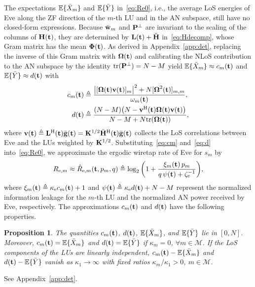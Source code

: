 \documentclass[journal]{IEEEtran}
\newtheorem{proposition}{Proposition}
\begin{document}
The expectations $\mathbb{E}\{\bar X_m\}$ and $\mathbb{E}\{\bar Y\}$ in~\eqref{eq:Re0}, i.e., the average LoS energies of Eve along the ZF direction of the $m$-th LU and in the AN subspace, still have no closed-form expressions. Because $\bar{\mathbf{w}}_m$ and $\mathbf{P}^{\perp}$ are invariant to the scaling of the columns of $\mathbf{H}(\mathbf{t})$, they are determined by $\mathbf{L}(\mathbf{t})+\tilde{\mathbf{H}}$ in~\eqref{eq:Hdecomp}, whose Gram matrix has the mean $\boldsymbol{\Phi}(\mathbf{t})$. As derived in Appendix~\ref{app:det}, replacing the inverse of this Gram matrix with $\boldsymbol{\Omega}(\mathbf{t})$ and calibrating the NLoS contribution to the AN subspace by the identity $\mathrm{tr}(\mathbf{P}^{\perp})=N-M$ yield $\mathbb{E}\{\bar X_m\}\approx c_m(\mathbf{t})$ and $\mathbb{E}\{\bar Y\}\approx d(\mathbf{t})$ with
\begin{align}
c_m(\mathbf{t})&\triangleq\frac{\big|[\boldsymbol{\Omega}(\mathbf{t})\mathbf{v}(\mathbf{t})]_m\big|^2+N[\boldsymbol{\Omega}^2(\mathbf{t})]_{m,m}}{\omega_m(\mathbf{t})},\label{eq:cm}\\
d(\mathbf{t})&\triangleq\frac{(N-M)\big(N-\mathbf{v}^{\mathrm H}(\mathbf{t})\boldsymbol{\Omega}(\mathbf{t})\mathbf{v}(\mathbf{t})\big)}{N-M+N\mathrm{tr}(\boldsymbol{\Omega}(\mathbf{t}))},\label{eq:d}
\end{align}
where $\mathbf{v}(\mathbf{t})\triangleq\mathbf{L}^{\mathrm H}(\mathbf{t})\bar{\mathbf{g}}(\mathbf{t})=\mathbf{K}^{1/2}\bar{\mathbf{H}}^{\mathrm H}(\mathbf{t})\bar{\mathbf{g}}(\mathbf{t})$ collects the LoS correlations between Eve and the LUs weighted by $\mathbf{K}^{1/2}$. Substituting~\eqref{eq:cm} and~\eqref{eq:d} into~\eqref{eq:Re0}, we approximate the ergodic wiretap rate of Eve for $s_m$ by
\begin{equation}\label{eq:Re}
R_{\mathrm{e},m}\approx\hat R_{\mathrm{e},m}(\mathbf{t},p_m,q)\triangleq\log_2\bigg(1+\frac{\xi_m(\mathbf{t})\,p_m}{q\,\psi(\mathbf{t})+\zeta_{\mathrm e}^{-1}}\bigg),
\end{equation}
where $\xi_m(\mathbf{t})\triangleq\kappa_{\mathrm e}c_m(\mathbf{t})+1$ and $\psi(\mathbf{t})\triangleq\kappa_{\mathrm e}d(\mathbf{t})+N-M$ represent the normalized information leakage for the $m$-th LU and the normalized AN power received by Eve, respectively. The approximations $c_m(\mathbf{t})$ and $d(\mathbf{t})$ have the following properties.

\begin{proposition}\label{prop:eve}
The quantities $c_m(\mathbf{t})$, $d(\mathbf{t})$, $\mathbb{E}\{\bar X_m\}$, and $\mathbb{E}\{\bar Y\}$ lie in $[0,N]$. Moreover, $c_m(\mathbf{t})=\mathbb{E}\{\bar X_m\}$ and $d(\mathbf{t})=\mathbb{E}\{\bar Y\}$ if $\kappa_m=0$, $\forall m\in\mathcal M$. If the LoS components of the LUs are linearly independent, $c_m(\mathbf{t})-\mathbb{E}\{\bar X_m\}$ and $d(\mathbf{t})-\mathbb{E}\{\bar Y\}$ vanish as $\kappa_1\to\infty$ with fixed ratios $\kappa_m/\kappa_1>0$, $m\in\mathcal M$.
\end{proposition}
\begin{IEEEproof}
See Appendix~\ref{app:det}.
\end{IEEEproof}
\end{document}
